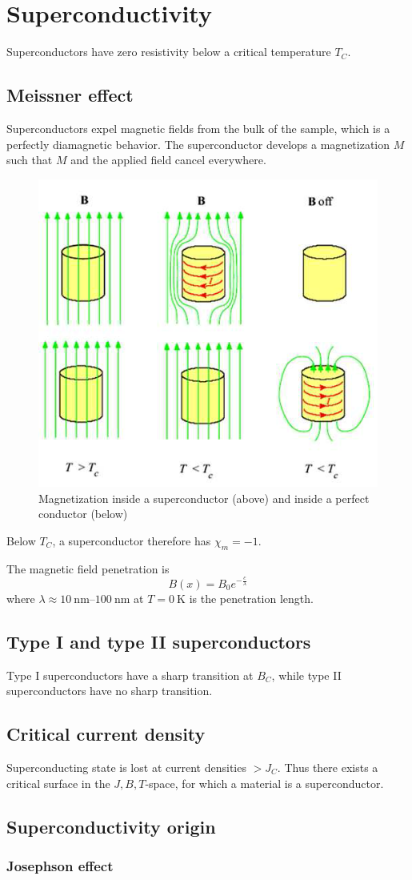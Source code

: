 \section{Superconductivity}

Superconductors have zero resistivity below a critical temperature $T_C$. 

\subsection{Meissner effect}
Superconductors expel magnetic fields from the bulk of the sample, which
is a perfectly diamagnetic behavior.
The superconductor develops a magnetization $M$ such that $M$ and the
applied field cancel everywhere.

\begin{figure}[ht!]
    \centering
    \includegraphics[width=0.4\linewidth]{images/superconductor.png}
    \caption{Magnetization inside a superconductor (above) and inside a perfect conductor (below)}
\end{figure}

Below $T_C$, a superconductor therefore has $\chi_m = -1$.

The magnetic field penetration is
\begin{equation}
    B(x) = B_0 e^{-\frac{c}{\lambda}}
\end{equation}
where $\lambda \approx \SIrange[range-phrase=\ldots]{10}{100}{\nano\meter}$ at $T=\SI{0}{\kelvin}$ is the penetration length.

\subsection{Type I and type II superconductors}
Type I superconductors have a sharp transition at $B_C$, while 
type II superconductors have no sharp transition.

\subsection{Critical current density}
Superconducting state is lost at current densities $>J_C$.
Thus there exists a critical surface in the $J,B,T$-space, for which a material is a superconductor.

\subsection{Superconductivity origin}
\subsubsection{Josephson effect}